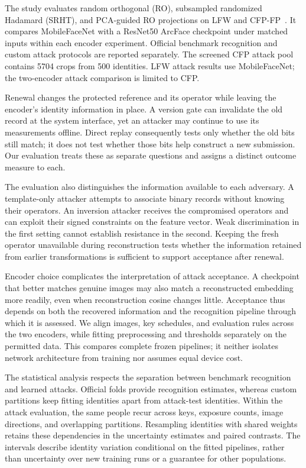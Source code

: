 The study evaluates random orthogonal (RO), subsampled randomized Hadamard (SRHT), and PCA-guided RO projections on LFW and CFP-FP~\cite{huang2007lfw,sengupta2016cfp}. It compares MobileFaceNet with a ResNet50 ArcFace checkpoint under matched inputs within each encoder experiment. Official benchmark recognition and custom attack protocols are reported separately. The screened CFP attack pool contains 5704 crops from 500 identities. LFW attack results use MobileFaceNet; the two-encoder attack comparison is limited to CFP.


Renewal changes the protected reference and its operator while leaving the encoder's identity information in place. A version gate can invalidate the old record at the system interface, yet an attacker may continue to use its measurements offline. Direct replay consequently tests only whether the old bits still match; it does not test whether those bits help construct a new submission. Our evaluation treats these as separate questions and assigns a distinct outcome measure to each.

The evaluation also distinguishes the information available to each adversary. A template-only attacker attempts to associate binary records without knowing their operators. An inversion attacker receives the compromised operators and can exploit their signed constraints on the feature vector. Weak discrimination in the first setting cannot establish resistance in the second. Keeping the fresh operator unavailable during reconstruction tests whether the information retained from earlier transformations is sufficient to support acceptance after renewal.

Encoder choice complicates the interpretation of attack acceptance. A checkpoint that better matches genuine images may also match a reconstructed embedding more readily, even when reconstruction cosine changes little. Acceptance thus depends on both the recovered information and the recognition pipeline through which it is assessed. We align images, key schedules, and evaluation rules across the two encoders, while fitting preprocessing and thresholds separately on the permitted data. This compares complete frozen pipelines; it neither isolates network architecture from training nor assumes equal device cost.

The statistical analysis respects the separation between benchmark recognition and learned attacks. Official folds provide recognition estimates, whereas custom partitions keep fitting identities apart from attack-test identities. Within the attack evaluation, the same people recur across keys, exposure counts, image directions, and overlapping partitions. Resampling identities with shared weights retains these dependencies in the uncertainty estimates and paired contrasts. The intervals describe identity variation conditional on the fitted pipelines, rather than uncertainty over new training runs or a guarantee for other populations.

